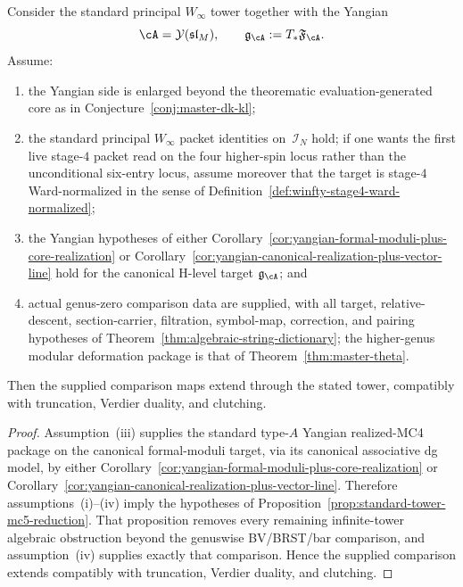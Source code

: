 \begin{corollary}
\label{cor:standard-tower-mc5-closure}
Consider the standard principal
\texorpdfstring{$W_\infty$}{W_infty} tower together with the Yangian
\[
\cA=\mathcal{Y}(\mathfrak{sl}_M),
\qquad
\mathfrak{g}_{\cA}:=T_*\mathfrak{F}_{\cA}.
\]
Assume:
\begin{enumerate}[label=\textup{(\roman*)}]
\item the Yangian side is enlarged beyond the theorematic
  evaluation-generated core as in
  Conjecture~\ref{conj:master-dk-kl};
\item the standard principal \texorpdfstring{$W_\infty$}{W_infty}
  packet identities on~$\mathcal{I}_N$ hold; if one wants the first
  live stage-$4$ packet read on the four higher-spin locus rather than
  the unconditional six-entry locus, assume moreover that the target is
  stage-$4$ Ward-normalized in the sense of
  Definition~\ref{def:winfty-stage4-ward-normalized};
\item the Yangian hypotheses of
  either Corollary~\ref{cor:yangian-formal-moduli-plus-core-realization}
  or Corollary~\ref{cor:yangian-canonical-realization-plus-vector-line}
  hold for the canonical H-level target $\mathfrak{g}_{\cA}$; and
\item actual genus-zero comparison data are supplied, with all target, relative-descent, section-carrier, filtration, symbol-map, correction, and pairing hypotheses of Theorem~\ref{thm:algebraic-string-dictionary};
  the higher-genus modular deformation package is that of Theorem~\ref{thm:master-theta}.
\end{enumerate}
Then the supplied comparison maps extend through the stated tower, compatibly with truncation, Verdier duality, and clutching.
\end{corollary}

\begin{proof}
Assumption~\textup{(iii)} supplies the standard type-$A$ Yangian
realized-MC4 package on the canonical formal-moduli target, via its
canonical associative dg model, by either
Corollary~\ref{cor:yangian-formal-moduli-plus-core-realization} or
Corollary~\ref{cor:yangian-canonical-realization-plus-vector-line}.
Therefore assumptions~\textup{(i)}--\textup{(iv)} imply the hypotheses
of Proposition~\ref{prop:standard-tower-mc5-reduction}.  That
proposition removes every remaining infinite-tower algebraic
obstruction beyond the genuswise BV/BRST/bar comparison, and
assumption~\textup{(iv)} supplies exactly that comparison.  Hence the
supplied comparison extends compatibly with truncation, Verdier duality, and clutching.
\end{proof}

